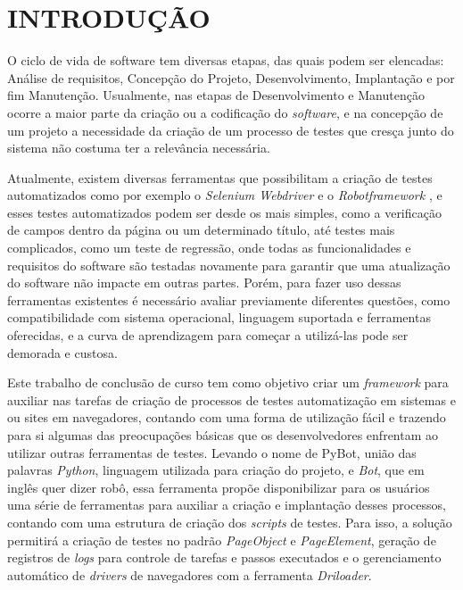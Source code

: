 %
%

\chapter{INTRODUÇÃO}\label{chap:introducao}

O ciclo de vida de software tem diversas etapas, das quais podem ser elencadas: Análise de requisitos, Concepção do Projeto, Desenvolvimento,
Implantação e por fim Manutenção. Usualmente, nas etapas de Desenvolvimento e Manutenção ocorre a maior parte da criação ou a codificação do
\textit{software}, e na concepção de um projeto a necessidade da criação de um processo de testes que cresça junto do sistema não costuma ter
a relevância necessária.

Atualmente, existem diversas ferramentas que possibilitam a criação de testes automatizados como por exemplo o \textit{Selenium Webdriver} \cite{selenium}
e o \textit{Robotframework} \cite{robotframework}, e esses testes automatizados podem ser desde os mais simples, como a verificação de campos dentro da página
ou um determinado título, até testes mais complicados, como um teste de regressão, onde todas as funcionalidades e requisitos
do software são testadas novamente para garantir que uma atualização do software não impacte em outras partes. Porém, para fazer uso dessas
ferramentas existentes é necessário avaliar previamente diferentes questões, como compatibilidade com sistema operacional, linguagem suportada
e ferramentas oferecidas, e a curva de aprendizagem para começar a utilizá-las pode ser demorada e custosa.

Este trabalho de conclusão de curso tem como objetivo criar um \textit{framework} para auxiliar nas tarefas de criação de processos de testes automatização em sistemas e ou
sites em navegadores, contando com uma forma de utilização fácil e trazendo para si algumas das
preocupações básicas que os desenvolvedores enfrentam ao utilizar outras ferramentas de testes. Levando o nome de PyBot, união das palavras \textit{Python},
linguagem utilizada para criação do projeto, e \textit{Bot}, que em inglês quer dizer robô, essa ferramenta propõe disponibilizar para os usuários uma série de
ferramentas para auxiliar a criação e implantação desses processos, contando com uma estrutura de criação dos \textit{scripts} de testes. Para isso,
a solução permitirá a criação de testes no padrão \textit{PageObject} e \textit{PageElement}, geração de registros de \textit{logs} para controle de tarefas e passos
executados e o gerenciamento automático de \textit{drivers} de navegadores com a ferramenta \textit{Driloader}.


